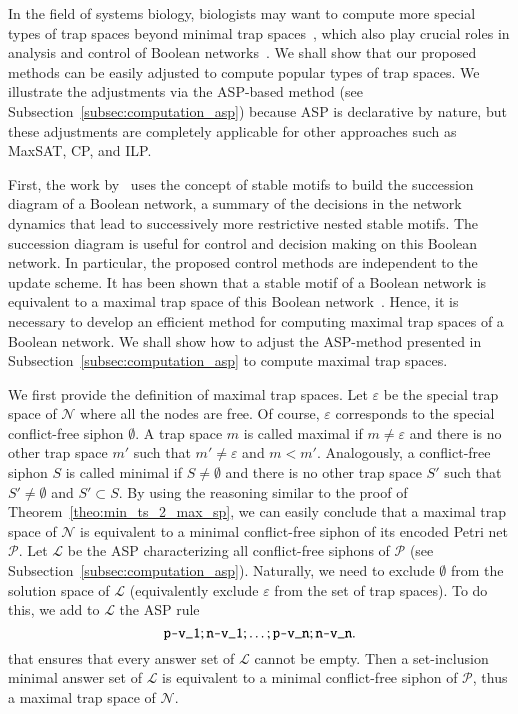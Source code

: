\documentclass[preprint,12pt]{elsarticle}
\begin{document}
In the field of systems biology, biologists may want to compute more special types of trap spaces beyond minimal trap spaces~\cite{klarner2017pyboolnet}, which also play crucial roles in analysis and control of Boolean networks~\cite{cifuentes2020control,Rozum2021}.
We shall show that our proposed methods can be easily adjusted to compute popular types of trap spaces.
We illustrate the adjustments via the ASP-based method (see Subsection~\ref{subsec:computation_asp}) because ASP is declarative by nature, but these adjustments are completely applicable for other approaches such as MaxSAT, CP, and ILP\@.

First, the work by~\cite{Rozum2021} uses the concept of stable motifs to build the succession diagram of a Boolean network, a summary of the decisions in the network dynamics that lead to successively more restrictive nested stable motifs.
The succession diagram is useful for control and decision making on this Boolean network.
In particular, the proposed control methods are independent to the update scheme.
It has been shown that a stable motif of a Boolean network is equivalent to a maximal trap space of this Boolean network~\cite{Rozum2021}.
Hence, it is necessary to develop an efficient method for computing maximal trap spaces of a Boolean network.
We shall show how to adjust the ASP-method presented in Subsection~\ref{subsec:computation_asp} to compute maximal trap spaces.

We first provide the definition of maximal trap spaces.
Let \(\varepsilon\) be the special trap space of \(\mathcal{N}\) where all the nodes are free.
Of course, \(\varepsilon\) corresponds to the special conflict-free siphon \(\emptyset\).
A trap space \(m\) is called maximal if \(m \neq \varepsilon\) and there is no other trap space \(m'\) such that \(m' \neq \varepsilon\) and \(m < m'\).
Analogously, a conflict-free siphon \(S\) is called minimal if \(S \neq \emptyset\) and there is no other trap space \(S'\) such that \(S' \neq \emptyset\) and \(S' \subset S\).
By using the reasoning similar to the proof of Theorem~\ref{theo:min_ts_2_max_sp}, we can easily conclude that a maximal trap space of \(\mathcal{N}\) is equivalent to a minimal conflict-free siphon of its encoded Petri net \(\mathcal{P}\).
Let \(\mathcal{L}\) be the ASP characterizing all conflict-free siphons of \(\mathcal{P}\) (see Subsection~\ref{subsec:computation_asp}).
Naturally, we need to exclude \(\emptyset\) from the solution space of \(\mathcal{L}\) (equivalently exclude \(\varepsilon\) from the set of trap spaces).
To do this, we add to \(\mathcal{L}\) the ASP rule
\[
  \verb|p-v_1| ; \verb|n-v_1| ; \dots ; \verb|p-v_n| ; \verb|n-v_n|.
\]
that ensures that every answer set of \(\mathcal{L}\) cannot be empty.
Then a set-inclusion minimal answer set of \(\mathcal{L}\) is equivalent to a minimal conflict-free siphon of \(\mathcal{P}\), thus a maximal trap space of \(\mathcal{N}\).
\end{document}
